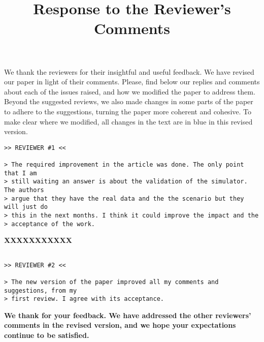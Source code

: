 \documentclass{article}
\title{Response to the Reviewer's Comments}
\begin{document}
\maketitle

We thank the reviewers for their insightful and useful feedback. We have revised our paper in light of their comments. Please, find below our replies and comments about each of the issues raised, and how we modified the paper to address them. Beyond the suggested reviews, we also made changes in some parts of the paper to adhere to the suggestions, turning the paper more coherent and cohesive. To make clear where we modified, all changes in the text are in blue in this revised version.

\begin{verbatim}
>> REVIEWER #1 <<

> The required improvement in the article was done. The only point that I am
> still waiting an answer is about the validation of the simulator. The authors
> argue that they have the real data and the the scenario but they will just do
> this in the next months. I think it could improve the impact and the
> acceptance of the work.

\end{verbatim}

\textbf{XXXXXXXXXXX}

\begin{verbatim}

>> REVIEWER #2 <<

> The new version of the paper improved all my comments and suggestions, from my
> first review. I agree with its acceptance.

\end{verbatim}

\textbf{We thank for your feedback. We have addressed the other reviewers' comments in the revised version, and we hope your expectations continue to be satisfied.}
\end{document}
